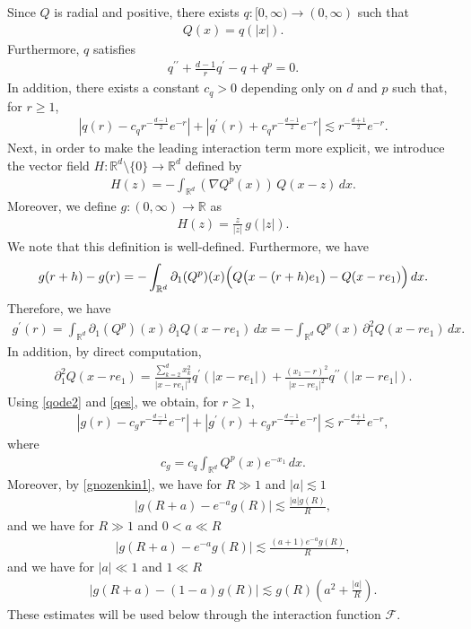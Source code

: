 \documentclass[reqno]{amsart}
\theoremstyle{plain}
\theoremstyle{definition}
\numberwithin{equation}{section}
\begin{document}
Since $Q$ is radial and positive, there exists $q:[0,\infty)\to (0,\infty)$ such that
\begin{align*}
Q(x)=q(|x|).
\end{align*}
Furthermore, $q$ satisfies
\begin{align}\label{qode2}
q^{\prime \prime}+\frac{d-1}{r}q^{\prime}-q+q^p=0.
\end{align}
In addition, there exists a constant $c_q>0$ depending only on $d$ and $p$ such that, for $r\geq 1$,
\begin{align}\label{qes}
|q(r)-c_qr^{-\frac{d-1}{2}}e^{-r}|+|q^{\prime}(r)+c_qr^{-\frac{d-1}{2}}e^{-r}|
\lesssim r^{-\frac{d+1}{2}}e^{-r}.
\end{align}
Next, in order to make the leading interaction term more explicit, we introduce the vector field
$H:\mathbb{R}^d\setminus\{0\}\to\mathbb{R}^d$ defined by
\begin{align}\label{Hdef}
H(z)=-\int_{\mathbb{R}^d}(\nabla Q^p(x))\,Q(x-z)\,dx.
\end{align}
Moreover, we define $g:(0,\infty)\to\mathbb{R}$ as
\begin{align*}
H(z)=\frac{z}{|z|}\,g(|z|).
\end{align*}
We note that this definition is well-defined. Furthermore, we have 
\begin{align*}
g(r+h)-g(r)
=-\int_{\mathbb{R}^d} {\partial}_1(Q^p)(x)\Bigl( Q\bigl(x-(r+h)e_1\bigr)-Q(x-re_1)\Bigr)\,dx.
\end{align*}
Therefore, we have 
\begin{align*}
g^{\prime}(r)
=\int_{\mathbb{R}^d} {\partial}_1(Q^p)(x)\,{\partial}_1Q(x-re_1)\,dx
=-\int_{\mathbb{R}^d}Q^p(x)\,{\partial}_1^2Q(x-re_1)\,dx.
\end{align*}
In addition, by direct computation,
\begin{align*}
{\partial}_1^2Q(x-re_1)
=\frac{\sum_{k=2}^dx_k^2}{|x-re_1|^3}q^{\prime}(|x-re_1|)
+\frac{(x_1-r)^2}{|x-re_1|^2}q^{\prime \prime}(|x-re_1|).
\end{align*}
Using \eqref{qode2} and \eqref{qes}, we obtain, for $r\geq1$,
\begin{align}\label{gnozenkin1}
|g(r)-c_gr^{-\frac{d-1}{2}}e^{-r}|+|g^{\prime}(r)+c_gr^{-\frac{d-1}{2}}e^{-r}|
\lesssim r^{-\frac{d+1}{2}}e^{-r},
\end{align}
where
\begin{align*}
c_g=c_q\int_{\mathbb{R}^d} Q^p(x)e^{-x_1}\,dx.
\end{align*}
Moreover, by \eqref{gnozenkin1}, we have for $R\gg 1$ and $|a|\lesssim 1$
\begin{align}\label{gnozenkin2}
 \left|g(R+a)-e^{-a}g(R)\right|\lesssim \frac{|a|g(R)}{R},
 \end{align}
 and we have for $R\gg 1$ and $0< a\ll R$
 \begin{align}\label{gnozenkin4}
\left|g(R+a)-e^{-a}g(R)\right|\lesssim \frac{(a+1)e^{-a}g(R)}{R},
\end{align}
 and we have for $|a|\ll 1$ and $1\ll R$
 \begin{align}\label{gnozenkin3}
\left|g(R+a)-(1-a)g(R)\right|\lesssim g(R)\left(a^2+\frac{|a|}{R}\right).
\end{align}
These estimates will be used below through the interaction function $\mathcal F$.
\end{document}

